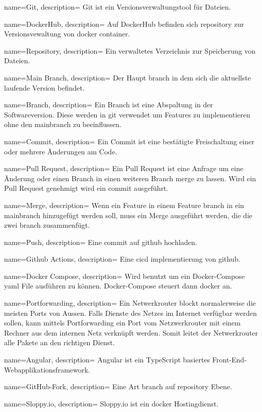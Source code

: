 {
	name=Git,
	description={
		Git ist ein Versionsverwaltungstool für Dateien.\cite{git}
	}
}

{
	name=DockerHub,
	description={
		Auf DockerHub befinden sich \gls{repository} zur Versionsvewaltung von \gls{docker} \gls{container}.\cite{dockerhub}
	}
}

{
	name=Repository,
	description={
		Ein verwaltetes Verzeichnis zur Speicherung von Dateien.
	}
}

{
	name=Main Branch,
	description={
		Der Haupt \gls{branch} in dem sich die aktuellste laufende Version befindet.
	}
}

{
	name=Branch,
	description={
		Ein Branch ist eine Abspaltung in der Softwareversion. Diese werden in \gls{git} verwendet um Features zu implementieren ohne den \gls{mainbranch} zu beeinflussen.\cite{branch}
	}
}

{
	name=Commit,
	description={
		Ein Commit ist eine bestätigte Freischaltung einer oder mehrere Änderungen am Code.
	}
}

{
	name=Pull Request,
	description={
		Ein Pull Request ist eine Anfrage um eine Änderung oder einen Branch in einen weiteren Branch \gls{merge} zu lassen. Wird ein Pull Request genehmigt wird ein \gls{commit} ausgeführt.
	}
}

{
	name=Merge,
	description={
		Wenn ein Feature in einem Feature \gls{branch} in ein \gls{mainbranch} hinzugefügt werden soll, muss ein Merge ausgeführt werden, die die zwei \gls{branch} zusammenfügt.\cite{merge}
	}
}

{
	name=Push,
	description={
		Eine \gls{commit} auf \gls{github} hochladen.
	}
}

{
	name=Github Actions,
	description={
		Eine \gls{cicd} implementierung von \gls{github}.
	}
}

{
	name=Docker Compose,
	description={
		Wird benutzt um ein Docker-Compose \gls{yaml} File ausführen zu können. Docker-Compose steuert dann \gls{docker} an.\cite{Dockercompose}
	}
}

{
	name=Portforwarding,
	description={
		Ein Netwerkrouter blockt normalerweise die meisten Ports von Aussen. Falls Dienste des Netzes im Internet verfügbar werden sollen, kann mittels Portforwarding ein Port vom Netzwerkrouter mit einem Rechner aus dem internen Netz verknüpft werden. Somit leitet der Netwerkrouter alle Pakete an den richtigen Dienst.\cite{Portforwarding}
	}
}

{
	name=Angular,
	description={
		Angular ist ein TypeScript basiertes Front-End-Webapplikationsframework.\cite{Angular}
	}
}

{
	name=GitHub-Fork,
	description={
		Eine Art \gls{branch} auf \gls{repository} Ebene.\cite{Github-Fork}
	}
}

{
	name=Sloppy.io,
	description={
		Sloppy.io ist ein \gls{docker} Hostingdienst.\cite{Sloppy}
	}
}
